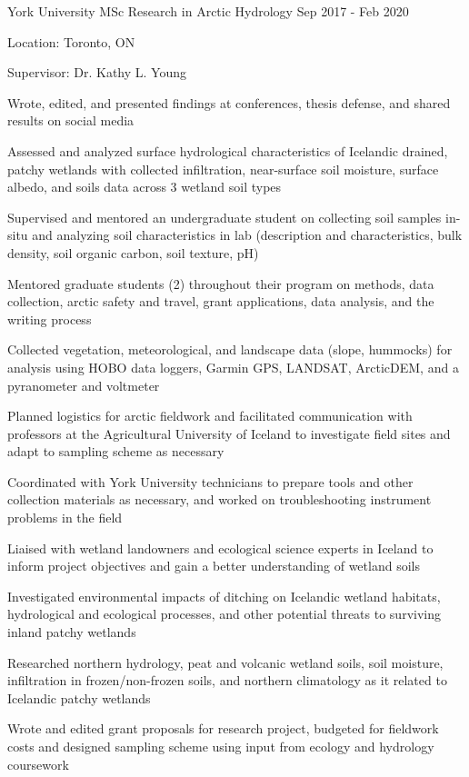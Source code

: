 \documentclass{../styles/cv}
\begin{document}
\subsectionpositiondate
    {York University}
    {MSc Research in Arctic Hydrology}
    {Sep 2017 - Feb 2020}
\resumesublistbegin
    \item Location: Toronto, ON
    \item Supervisor: Dr. Kathy L. Young
    \item Wrote, edited, and presented findings at conferences, thesis defense, and shared results on social media
    \item Assessed and analyzed surface hydrological characteristics of Icelandic drained, patchy wetlands with collected infiltration, near-surface soil moisture, surface albedo, and soils data across 3 wetland soil types
    \item Supervised and mentored an undergraduate student on collecting soil samples in-situ and analyzing soil characteristics in lab (description and characteristics, bulk density, soil organic carbon, soil texture, pH)
    \item Mentored graduate students (2) throughout their program on methods, data collection, arctic safety and travel, grant applications, data analysis, and the writing process
    \item Collected vegetation, meteorological, and landscape data (slope, hummocks) for analysis using HOBO data loggers, Garmin GPS, LANDSAT, ArcticDEM, and a pyranometer and voltmeter
    \item Planned logistics for arctic fieldwork and facilitated communication with professors at the Agricultural University of Iceland to investigate field sites and adapt to sampling scheme as necessary
    \item Coordinated with York University technicians to prepare tools and other collection materials as necessary, and worked on troubleshooting instrument problems in the field
    \item Liaised with wetland landowners and ecological science experts in Iceland to inform project objectives and gain a better understanding of wetland soils
    \item Investigated environmental impacts of ditching on Icelandic wetland habitats, hydrological and ecological processes, and other potential threats to surviving inland patchy wetlands
    \item Researched northern hydrology, peat and volcanic wetland soils, soil moisture, infiltration in frozen/non-frozen soils, and northern climatology as it related to Icelandic patchy wetlands
    \item Wrote and edited grant proposals for research project, budgeted for fieldwork costs and designed sampling scheme using input from ecology and hydrology coursework
\end{document}

